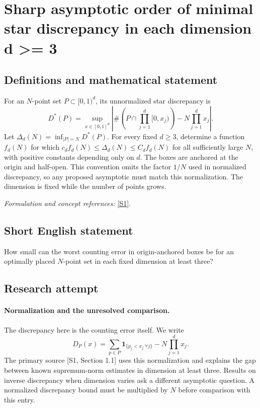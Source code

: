 \documentclass[11pt]{article}
\begin{document}
\section*{\texorpdfstring{Sharp asymptotic order of minimal star discrepancy in each dimension d >= 3}{Sharp asymptotic order of minimal star discrepancy in each dimension d >= 3}}\label{368}
\subsection{Definitions and mathematical statement}
For an $N$-point set $P\subset[0,1)^d$, its unnormalized star discrepancy is
\[
 D^*(P)=\sup_{x\in[0,1]^d}
 \left|\#\left(P\cap\prod_{j=1}^d[0,x_j)\right)-N\prod_{j=1}^dx_j\right|.
\]
Let $\Delta_d(N)=\inf_{|P|=N}D^*(P)$. For every fixed $d\ge3$, determine a function $f_d(N)$ for which $c_df_d(N)\le\Delta_d(N)\le C_df_d(N)$ for all sufficiently large $N$, with positive constants depending only on $d$. The boxes are anchored at the origin and half-open. This convention omits the factor $1/N$ used in normalized discrepancy, so any proposed asymptotic must match this normalization. The dimension is fixed while the number of points grows.
\par\smallskip\textit{Formulation and concept references:} \href{https://www-users.cse.umn.edu/~dbilyk/bilyk-research.pdf}{[S1]}.

\subsection{Short English statement}
How small can the worst counting error in origin-anchored boxes be for an optimally placed $N$-point set in each fixed dimension at least three?
\subsection{Research attempt}
\paragraph{Normalization and the unresolved comparison.}
The discrepancy here is the counting error itself. We write
\[
 D_P(x)=\sum_{p\in P}\mathbf1_{\{p_j<x_j\ \forall j\}}
                         -N\prod_{j=1}^dx_j.
\]
The primary source [S1, Section 1.1] uses this normalization and
explains the gap between known supremum-norm estimates in dimension
at least three. Results on inverse discrepancy when dimension varies
ask a different asymptotic question. A normalized discrepancy bound
must be multiplied by $N$ before comparison with this entry.
\end{document}
